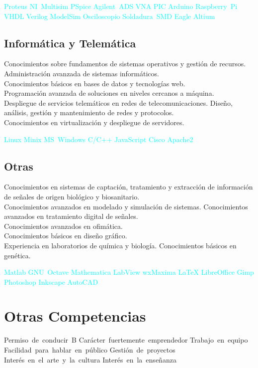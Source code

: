 \documentclass[11pt,a4paper,sans,spanish]{moderncv}
\begin{document}
\begin{center}
\textcolor{cyan}{
Proteus \quad{} NI~Multisim \quad{} PSpice \quad{} Agilent~ADS \quad{} VNA \quad{} PIC \quad{} Arduino \quad{} Raspberry~Pi \quad{} VHDL \quad{} Verilog \quad{} ModelSim \quad{} Osciloscopio \quad{} Soldadura~SMD \quad{} Eagle \quad{} Altium
}
\end{center}

\subsection{Informática y Telemática}
Conocimientos sobre fundamentos de sistemas operativos y gestión de recursos.
Administración avanzada de sistemas informáticos.
\protect\\[0.3em]
Conocimientos básicos en bases de datos y tecnologías web.
\protect\\[0.3em]
Programación avanzada de soluciones en niveles cercanos a máquina.
\protect\\[0.3em]
Despliegue de servicios telemáticos en redes de telecomunicaciones. Diseño, análisis, gestión y mantenimiento de redes y protocolos.
\protect\\[0.3em]
Conocimientos en virtualización y despliegue de servidores.

\begin{center}
\textcolor{cyan}{
Linux \quad{} Minix \quad{} MS~Windows \quad{} C/C++ \quad{} JavaScript \quad{} Cisco \quad{} Apache2 
}
\end{center}

\subsection{Otras}
Conocimientos en sistemas de captación, tratamiento y extracción de información de señales de origen biológico y biosanitario.
\protect\\[0.3em]
Conocimientos avanzados en modelado y simulación de sistemas.
Conocimientos avanzados en tratamiento digital de señales.
\protect\\[0.3em]
Conocimientos avanzados en ofimática.
\protect\\[0.3em]
Conocimientos básicos en diseño gráfico.
\protect\\[0.3em]
Experiencia en laboratorios de química y biología.
Conocimientos básicos en genética.

\begin{center}
\textcolor{cyan}{
Matlab \quad{} GNU~Octave \quad{} Mathematica \quad{} LabView \quad{} wxMaxima \quad{} LaTeX \quad{} LibreOffice \quad{} Gimp \quad{} Photoshop \quad{} Inkscape \quad{} AutoCAD
}
\end{center}


\section{Otras Competencias}
\begin{center}
Permiso~de~conducir~B \quad{} Carácter~fuertemente~emprendedor \quad{} Trabajo~en~equipo \quad{} Facilidad~para~hablar~en~público \quad{} Gestión~de~proyectos \quad{} Interés~en~el~arte~y~la~cultura \quad{} Interés~en~la~enseñanza
\end{center}
\end{document}
